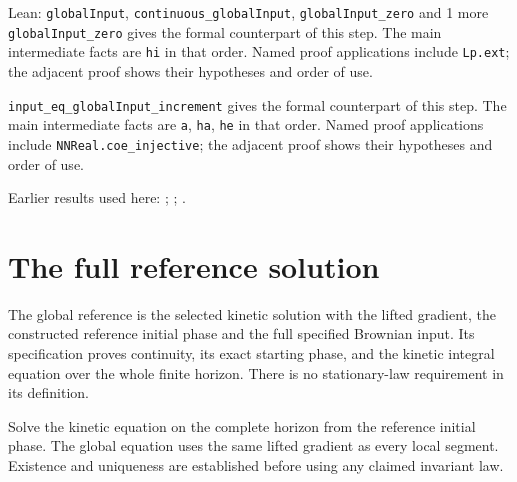 \documentclass[11pt,a4paper]{article}
\begin{document}
\begin{leanbox}{Lean: \texttt{globalInput}, \texttt{continuous\_\allowbreak{}globalInput}, \texttt{globalInput\_\allowbreak{}zero} and 1 more}
\texttt{global\allowbreak{}Input\_\allowbreak{}zero} gives the formal counterpart of this step. The main intermediate facts are \texttt{hi} in that order. Named proof applications include \texttt{Lp.\allowbreak{}ext}; the adjacent proof shows their hypotheses and order of use.




\texttt{input\_\allowbreak{}eq\_\allowbreak{}global\allowbreak{}Input\_\allowbreak{}increment} gives the formal counterpart of this step. The main intermediate facts are \texttt{a}, \texttt{ha}, \texttt{he} in that order. Named proof applications include \texttt{NNReal.\allowbreak{}coe\_\allowbreak{}injective}; the adjacent proof shows their hypotheses and order of use.
\end{leanbox}


Earlier results used here: \cite[Section~3.17.1]{LangevinLean2026ULASC}; \cite[Section~3.8.2]{LangevinLean2026ULASC}; \cite[Section~3.8.9]{LangevinLean2026ULASC}.

\section{\texorpdfstring{The full reference solution}{The full reference solution}}


The global reference is the selected kinetic solution with the lifted gradient, the constructed reference initial phase and the full specified Brownian input. Its specification proves continuity, its exact starting phase, and the kinetic integral equation over the whole finite horizon. There is no stationary-law requirement in its definition.



Solve the kinetic equation on the complete horizon from the reference initial phase. The global equation uses the same lifted gradient as every local segment. Existence and uniqueness are established before using any claimed invariant law.
\end{document}
